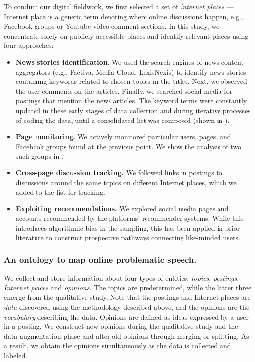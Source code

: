 To conduct our digital fieldwork, we first
selected a set of \emph{Internet places} --- Internet place is a generic term denoting where online discussions happen, e.g., Facebook groups or Youtube video comment sections.
In this study, we concentrate solely on publicly accessible places and
identify relevant places using four approaches:
\begin{itemize}
    \item \textbf{News stories identification.} We used the search engines of news content aggregators (e.g., Factiva, Media Cloud, LexisNexis) to identify news stories containing keywords related to chosen topics in the titles.
    Next, we observed the user comments on the articles.
    Finally, we searched social media for postings that mention the news articles. The keyword terms were constantly updated in these early stages of data collection and during iterative processes of coding the data, until a consolidated list was composed (shown in ).
    \item \textbf{Page monitoring.} We actively monitored particular users, pages, and Facebook groups found at the previous point.
    We show the analysis of two such groups in .
    \item \textbf{Cross-page discussion tracking.} We followed links in postings to discussions around the same topics on different Internet places, which we added to the list for tracking.
    \item \textbf{Exploiting recommendations.} We explored social media pages and accounts recommended by the platforms' recommender systems.
    While this introduces algorithmic bias in the sampling, this has been applied in prior literature \citep{woolley2016automation,woolley2018computational} to construct prospective pathways connecting like-minded users.
\end{itemize}

\subsubsection{An ontology to map online problematic speech.}
We collect and store information about four types of entities: \emph{topics}, \emph{postings}, \emph{Internet places} and \emph{opinions}.
The topics are predetermined, while the latter three emerge from the qualitative study.
Note that the postings and Internet places are \emph{data} discovered using the methodology described above, and the opinions are the \emph{vocabulary} describing the data.
Opinions are defined as ideas expressed by a user in a posting.
We construct new opinions during the qualitative study and the data augmentation phase and alter old opinions through merging or splitting.
As a result, we obtain the opinions simultaneously as the data is collected and labeled.%

